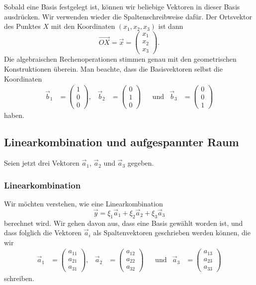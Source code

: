 Sobald eine Basis festgelegt ist, können wir beliebige Vektoren in dieser
Basis ausdrücken. 
Wir verwenden wieder die Spaltenschreibweise dafür.
Der Ortsvektor des Punktes $X$ mit den Koordinaten $(x_1,x_2,x_3)$ ist dann
\[
\overrightarrow{OX}
=
\vec{x}
= 
\begin{pmatrix}x_1\\x_2\\x_3\end{pmatrix}.
\]
Die algebraischen Rechenoperationen stimmen genau mit den geometrischen
Konstruktionen überein.
Man beachte, dass die Basisvektoren selbst die Koordinaten
\[
\begin{aligned}
\vec{b}_1 &= \begin{pmatrix}1\\0\\0\end{pmatrix}, &
\vec{b}_2 &= \begin{pmatrix}0\\1\\0\end{pmatrix} &
          &\text{und}&
\vec{b}_3 &= \begin{pmatrix}0\\0\\1\end{pmatrix}
\end{aligned}
\]
haben.

%
%
\subsection{Linearkombination und aufgespannter Raum}
Seien jetzt drei Vektoren $\vec{a}_1$, $\vec{a}_2$ und $\vec{a}_3$ gegeben.

\subsubsection{Linearkombination}
Wir möchten verstehen, wie eine Linearkombination
\[
\vec{y}
=
\xi_1\vec{a}_1
+
\xi_2\vec{a}_2
+
\xi_3\vec{a}_3
\]
berechnet wird.
Wir gehen davon aus, dass eine Basis gewählt worden ist, und dass
folglich die Vektoren $\vec{a}_i$ als Spaltenvektoren geschrieben
werden können, die wir
\[
\begin{aligned}
\vec{a}_1 &= \begin{pmatrix}a_{11}\\a_{21}\\a_{31}\end{pmatrix}, &
\vec{a}_2 &= \begin{pmatrix}a_{12}\\a_{22}\\a_{32}\end{pmatrix}
&&\text{und}&
\vec{a}_3 &= \begin{pmatrix}a_{13}\\a_{23}\\a_{33}\end{pmatrix}
\end{aligned}
\]
schreiben.

